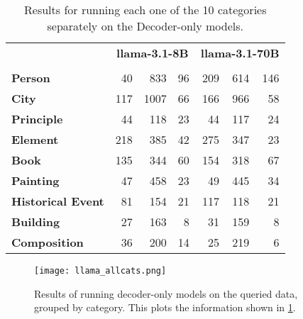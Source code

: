 \begin{table}[htbp]
	\centering
	\footnotesize
	\begin{tabular}{>{\bfseries}l | r r r | r r r}
		\toprule
			& \multicolumn{3}{c|}{\ttfamily \bfseries llama-3.1-8B} & \multicolumn{3}{c}{\ttfamily \bfseries llama-3.1-70B} \\
			& \Parametric{} & \Contextual{} & \Other{} & \Parametric{} & \Contextual{} & \Other{} \\
		\midrule
			Person           &  40 &  833 & 96 & 209 & 614 & 146 \\
			City             & 117 & 1007 & 66 & 166 & 966 &  58 \\
			Principle        &  44 &  118 & 23 &  44 & 117 &  24 \\
			Element          & 218 &  385 & 42 & 275 & 347 &  23 \\
			Book             & 135 &  344 & 60 & 154 & 318 &  67 \\
			Painting         &  47 &  458 & 23 &  49 & 445 &  34 \\
			Historical Event &  81 &  154 & 21 & 117 & 118 &  21 \\
			Building         &  27 &  163 &  8 &  31 & 159 &   8 \\
			Composition      &  36 &  200 & 14 &  25 & 219 &   6 \\
		\bottomrule
	\end{tabular}
	\caption{Results for running each one of the 10 categories separately on the Decoder-only models.}
	\label{llama_cats_table}
\end{table}

\begin{figure}[p]
	\centering
	\texttt{[image: llama\_allcats.png]}
	\caption{Results of running decoder-only models on the queried data, grouped by category. This plots the information shown in \cref{llama_cats_table}.}
	\label{llama_cats_result}
\end{figure}


